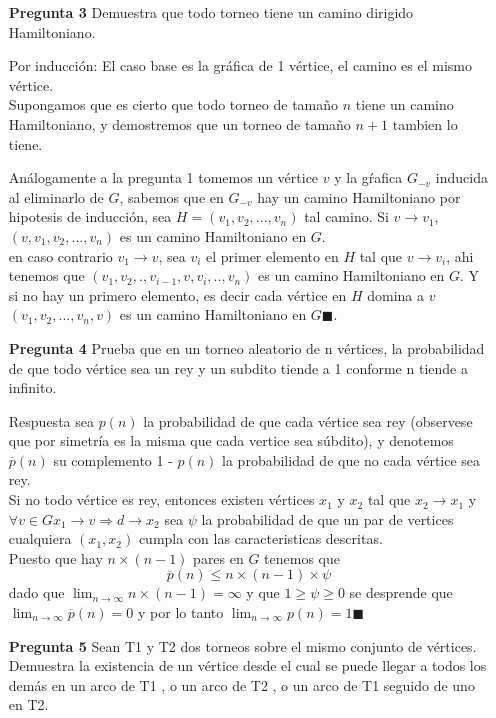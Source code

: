 \documentclass[12pt]{articlels
}
\begin{document}
\begin{itemize}
\item[\bf{Pregunta 3}] Demuestra que todo torneo tiene un camino dirigido Hamiltoniano.
\item[Por inducción:]
      El caso base es la gráfica de 1 vértice, el camino es el mismo vértice.\\
      Supongamos que es cierto que todo torneo de tamaño $n$ tiene un camino Hamiltoniano, y demostremos que un torneo de tamaño $n+1$ tambien lo tiene.

      Análogamente a la pregunta 1 tomemos un vértice $v$ y la gŕafica $G_{-v}$ inducida al eliminarlo de $G$, sabemos que en $G_{-v}$ hay un camino Hamiltoniano por hipotesis de inducción, sea $H=(v_1,v_2,...,v_n)$ tal camino.
      Si $v \rightarrow v_{1}$, $(v,v_1,v_2,...,v_n)$ es un camino Hamiltoniano en $G$.\\
      en caso contrario $v_1 \rightarrow v$, sea $v_i$ el primer elemento en $H$ tal que $v \rightarrow v_i$, ahi tenemos que $(v_1,v_2,.,v_{i-1},v,v_i,..,v_n)$ es un camino Hamiltoniano en $G$.
      Y si no hay un primero elemento, es decir cada vértice en $H$ domina a $v$ $(v_1,v_2,...,v_n,v)$ es un camino Hamiltoniano en $G \blacksquare$.\\


\item[\bf{Pregunta 4}] Prueba que en un torneo aleatorio de n vértices, la probabilidad de que todo vértice sea un rey y un subdito tiende a 1 conforme n tiende a infinito.
\item[Respuesta] sea $p(n)$ la probabilidad de que cada vértice sea rey (observese que por simetría es la misma que cada vertice sea súbdito), y denotemos $\overline p(n)$ su complemento 1 - $p(n)$ la probabilidad de que no cada vértice sea rey.\\

Si no todo vértice es rey, entonces existen vértices $x_1$ y $x_2$ tal que $x_2 \rightarrow x_1$ y $\forall v \in G x_1 \rightarrow  v  \Rightarrow d \rightarrow x_2$
sea $\psi $ la probabilidad de que un par de vertices cualquiera $(x_1,x_2)$ cumpla con las caracteristicas descritas.\\
 Puesto que hay $n \times (n-1)$ pares en $G$ tenemos que $$\overline p(n) \leq n \times (n-1) \times \psi$$ dado que $ \lim_{n\to\infty} n \times (n-1) = \infty $ y que $ 1 \ge \psi \ge 0$ se desprende que  $ \lim_{n\to\infty} \overline p(n)=0 $ y por lo tanto $\lim_{n\to\infty} p(n)=1 \blacksquare$

\item[\bf{Pregunta 5}]Sean T1 y T2 dos torneos sobre el mismo conjunto de vértices. Demuestra la existencia de un vértice desde el cual se puede llegar a todos los demás en un arco de T1 , o un arco de T2 , o un arco de T1 seguido de uno en T2.


\end{itemize}
\end{document}
